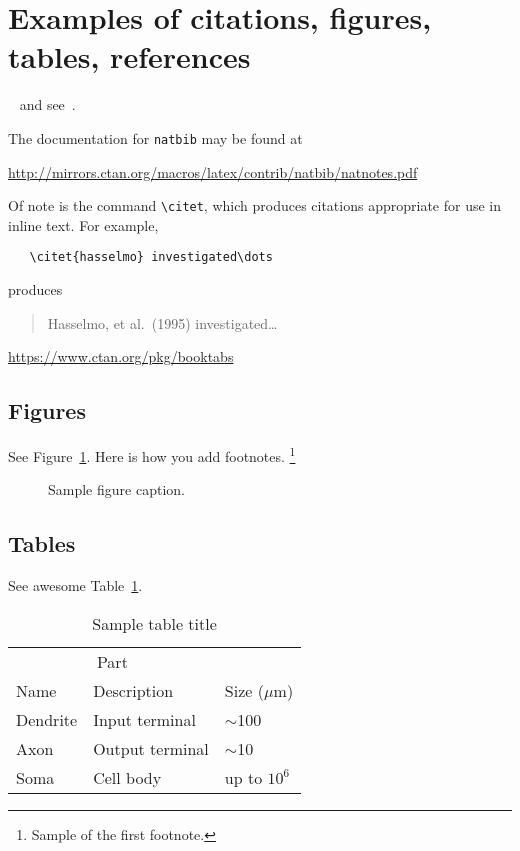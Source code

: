 \documentclass{article}
\begin{document}
  \section{Examples of citations, figures, tables, references}
  \label{sec:others}
  \lipsum[8]~\cite{kour2014real,kour2014fast} and see~\cite{hadash2018estimate}.

  The documentation for \verb+natbib+ may be found at
  \begin{center}
    \url{http://mirrors.ctan.org/macros/latex/contrib/natbib/natnotes.pdf}
  \end{center}
  Of note is the command \verb+\citet+, which produces citations
  appropriate for use in inline text. For example,
  \begin{verbatim}
   \citet{hasselmo} investigated\dots
  \end{verbatim}
  produces
  \begin{quote}
    Hasselmo, et al.\ (1995) investigated\dots
  \end{quote}

  \begin{center}
    \url{https://www.ctan.org/pkg/booktabs}
  \end{center}

  \subsection{Figures}
  \label{subsec:figures}
  \lipsum[10]
  See Figure~\ref{fig:fig1}. Here is how you add footnotes. \footnote{Sample of the first footnote.}
  \lipsum[11]

  \begin{figure}
    \centering
    \fbox{\rule[-.5cm]{4cm}{4cm} \rule[-.5cm]{4cm}{0cm}}
    \caption{Sample figure caption.}
    \label{fig:fig1}
  \end{figure}

  \subsection{Tables}
  \label{subsec:tables}
  \lipsum[12]
  See awesome Table~\ref{tab:table}.

  \begin{table}
    \caption{Sample table title}
    \centering
    \begin{tabular}{lll}
      \toprule
      \multicolumn{2}{c}{Part} \\
      \cmidrule(r){1-2}
      Name     & Description     & Size ($\mu$m) \\
      \midrule
      Dendrite & Input terminal  & $\sim$100     \\
      Axon     & Output terminal & $\sim$10      \\
      Soma     & Cell body       & up to $10^6$  \\
      \bottomrule
    \end{tabular}
    \label{tab:table}
  \end{table}
\end{document}
